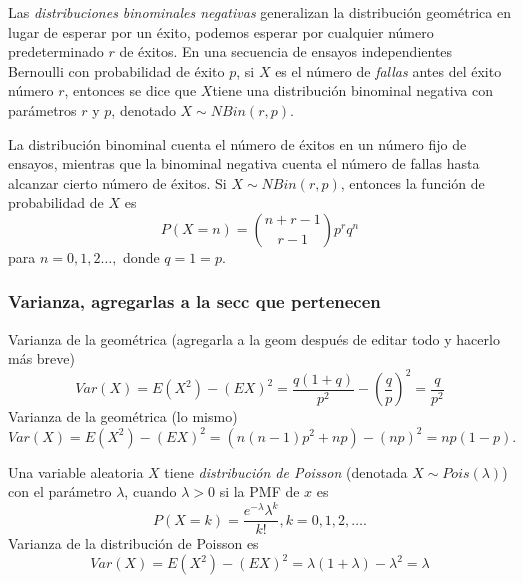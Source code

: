 Las \emph{distribuciones binominales negativas} generalizan la distribución geométrica en lugar de esperar por un éxito, podemos esperar por cualquier número predeterminado $r$ de éxitos. En una secuencia de ensayos independientes Bernoulli con probabilidad de éxito $p$, si $X$ es el número de \emph{fallas} antes del éxito número $r$, entonces se dice que $X$tiene una distribución binominal negativa con parámetros $r$ y $p$, denotado $X\sim NBin(r,p)$.

La distribución binominal cuenta el número de éxitos en un número fijo de ensayos, mientras que la binominal negativa cuenta el número de fallas hasta alcanzar cierto número de éxitos. Si $X\sim NBin(r,p)$, entonces la función de probabilidad de $X$ es
\begin{equation}
P(X=n)=\binom{n+r-1}{r-1}p^rq^n
\end{equation}
para $n=0,1,2\ldots,$ donde $q=1=p$.
\subsubsection{Varianza, agregarlas a la secc que pertenecen}
Varianza de la geométrica (agregarla a la geom después de editar todo y hacerlo más breve)
\begin{equation}
Var(X)=E(X^2)-{(EX)}^2=\frac{q(1+q)}{p^2}-{(\frac{q}{p})}^2=\frac{q}{p^2}
\end{equation}
Varianza de la geométrica (lo mismo)
\begin{equation}
Var(X)=E(X^2)-{(EX)}^2=(n(n-1)p^2+np)-(np)^2=np(1-p).
\end{equation}

Una variable aleatoria $X$ tiene \emph{distribución de Poisson} (denotada $X\sim Pois(\lambda)$) con el parámetro $\lambda$, cuando $\lambda > 0$ si la PMF de $x$ es
\begin{equation}
P(X=k)=\frac{e^{-\lambda}\lambda^k}{k!}, k=0,1,2,\ldots.
\end{equation}
Varianza de la distribución de Poisson es
\begin{equation}
Var(X)=E(X^2)-{(EX)}^2=\lambda(1+\lambda)-\lambda^2=\lambda
\end{equation}
